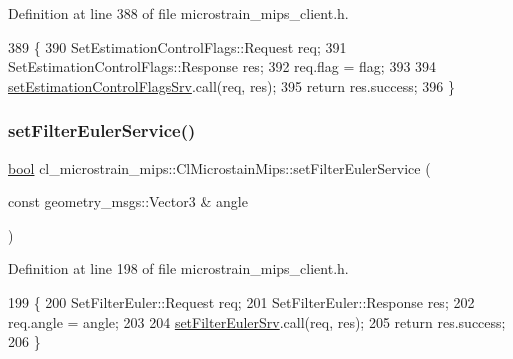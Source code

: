 Definition at line 388 of file microstrain\+\_\+mips\+\_\+client.\+h.


\begin{DoxyCode}
389     \{
390         SetEstimationControlFlags::Request req;
391         SetEstimationControlFlags::Response res;
392         req.flag = flag;
393 
394         \hyperlink{classcl__microstrain__mips_1_1ClMicrostainMips_a2eeff01aea4a41fd5d24ff2f77daf584}{setEstimationControlFlagsSrv}.call(req, res);
395         \textcolor{keywordflow}{return} res.success;
396     \}
\end{DoxyCode}
\mbox{\label{classcl__microstrain__mips_1_1ClMicrostainMips_af5d9e53254b967a2bc02343c2010a47b}} 
\subsubsection{\texorpdfstring{set\+Filter\+Euler\+Service()}{setFilterEulerService()}}
{\footnotesize\ttfamily \hyperlink{classbool}{bool} cl\+\_\+microstrain\+\_\+mips\+::\+Cl\+Microstain\+Mips\+::set\+Filter\+Euler\+Service (\begin{DoxyParamCaption}\item[{const geometry\+\_\+msgs\+::\+Vector3 \&}]{angle }\end{DoxyParamCaption})\hspace{0.3cm}{\ttfamily [inline]}}



Definition at line 198 of file microstrain\+\_\+mips\+\_\+client.\+h.


\begin{DoxyCode}
199     \{
200         SetFilterEuler::Request req;
201         SetFilterEuler::Response res;
202         req.angle = angle;
203 
204         \hyperlink{classcl__microstrain__mips_1_1ClMicrostainMips_a4e88ebd03c7a774e958f8902c18e7f69}{setFilterEulerSrv}.call(req, res);
205         \textcolor{keywordflow}{return} res.success;
206     \}
\end{DoxyCode}
\mbox{\label{classcl__microstrain__mips_1_1ClMicrostainMips_addede8b2d6eac488ff9de6acd0b28fa7}} 
